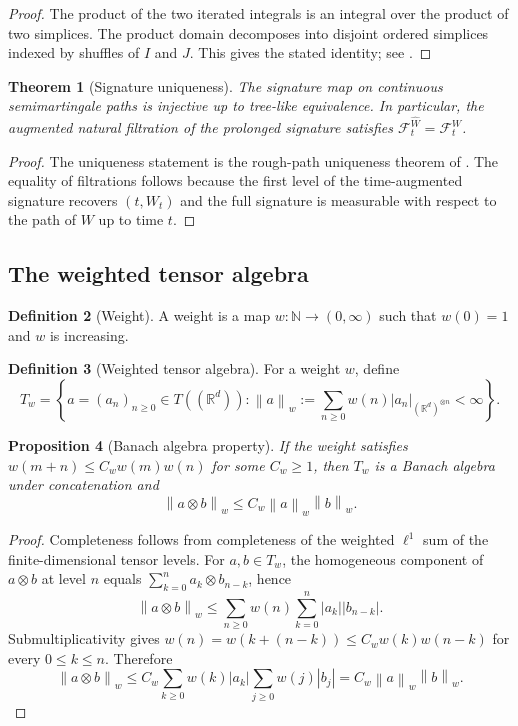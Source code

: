 \documentclass[11pt,oneside]{article}
\theoremstyle{plain}
\newtheorem{theorem}{Theorem}[section]
\newtheorem{proposition}[theorem]{Proposition}
\theoremstyle{definition}
\newtheorem{definition}[theorem]{Definition}
\theoremstyle{remark}
\newcommand{\R}{\mathbb{R}}
\newcommand{\N}{\mathbb{N}}
\newcommand{\Tw}{T_w}
\newcommand{\FWh}{\mathcal F^{\widehat W}}
\newcommand{\FW}{\mathcal F^W}
\newcommand{\norm}[1]{\left\lVert #1\right\rVert}
\newcommand{\abs}[1]{\left\lvert #1\right\rvert}
\begin{document}
\begin{proof}
The product of the two iterated integrals is an integral over the product of two simplices. The product domain decomposes into disjoint ordered simplices indexed by shuffles of $I$ and $J$. This gives the stated identity; see \citet[Chapters 1 and 6]{Reutenauer1993}.
\end{proof}

\begin{theorem}[Signature uniqueness]\label{thm:sig-unique}
The signature map on continuous semimartingale paths is injective up to tree-like equivalence. In particular, the augmented natural filtration of the prolonged signature satisfies $\FWh_t=\FW_t$.
\end{theorem}

\begin{proof}
The uniqueness statement is the rough-path uniqueness theorem of \citet{BoedihardjoGengLyonsYang2016}. The equality of filtrations follows because the first level of the time-augmented signature recovers $(t,W_t)$ and the full signature is measurable with respect to the path of $W$ up to time $t$.
\end{proof}

\subsection{The weighted tensor algebra}

\begin{definition}[Weight]
A weight is a map $w:\N\to(0,\infty)$ such that $w(0)=1$ and $w$ is increasing.
\end{definition}

\begin{definition}[Weighted tensor algebra]
For a weight $w$, define
\[
\Tw=\left\{a=(a_n)_{n\geq0}\in T((\R^d)): \norm{a}_w:=\sum_{n\geq0} w(n)\abs{a_n}_{(\R^d)^{\otimes n}}<\infty\right\}.
\]
\end{definition}

\begin{proposition}[Banach algebra property]\label{prop:banach-algebra}
If the weight satisfies $w(m+n)\leq C_w w(m)w(n)$ for some $C_w\geq1$, then $\Tw$ is a Banach algebra under concatenation and
\[
\norm{a\otimes b}_w\leq C_w\norm{a}_w\norm{b}_w.
\]
\end{proposition}

\begin{proof}
Completeness follows from completeness of the weighted $\ell^1$ sum of the finite-dimensional tensor levels. For $a,b\in\Tw$, the homogeneous component of $a\otimes b$ at level $n$ equals $\sum_{k=0}^{n}a_k\otimes b_{n-k}$, hence
\[
\norm{a\otimes b}_w\leq\sum_{n\geq0}w(n)\sum_{k=0}^{n}\abs{a_k}\abs{b_{n-k}}.
\]
Submultiplicativity gives $w(n)=w(k+(n-k))\leq C_w w(k)w(n-k)$ for every $0\leq k\leq n$. Therefore
\[
\norm{a\otimes b}_w\leq C_w\sum_{k\geq0}w(k)\abs{a_k}\sum_{j\geq0}w(j)\abs{b_j}=C_w\norm{a}_w\norm{b}_w.
\]
\end{proof}
\end{document}
